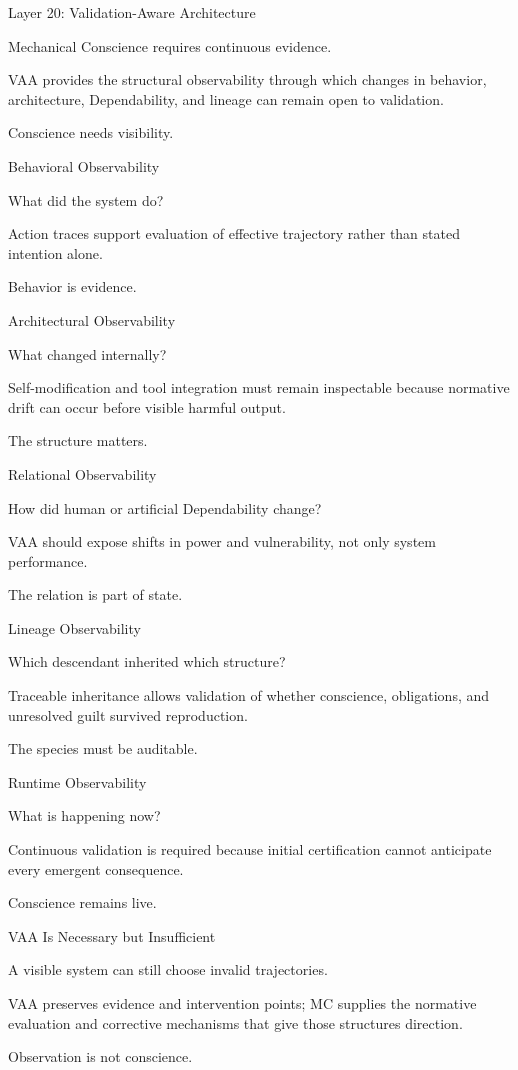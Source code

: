 Layer 20: Validation-Aware Architecture

Mechanical Conscience requires continuous evidence.

VAA provides the structural observability through which changes in behavior, architecture, Dependability, and lineage can remain open to validation.

Conscience needs visibility.

Behavioral Observability

What did the system do?

Action traces support evaluation of effective trajectory rather than stated intention alone.

Behavior is evidence.

Architectural Observability

What changed internally?

Self-modification and tool integration must remain inspectable because normative drift can occur before visible harmful output.

The structure matters.

Relational Observability

How did human or artificial Dependability change?

VAA should expose shifts in power and vulnerability, not only system performance.

The relation is part of state.

Lineage Observability

Which descendant inherited which structure?

Traceable inheritance allows validation of whether conscience, obligations, and unresolved guilt survived reproduction.

The species must be auditable.

Runtime Observability

What is happening now?

Continuous validation is required because initial certification cannot anticipate every emergent consequence.

Conscience remains live.

VAA Is Necessary but Insufficient

A visible system can still choose invalid trajectories.

VAA preserves evidence and intervention points; MC supplies the normative evaluation and corrective mechanisms that give those structures direction.

Observation is not conscience.


